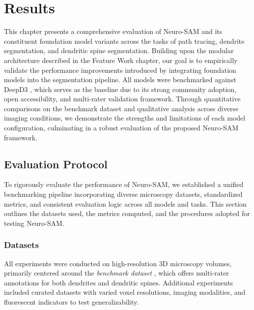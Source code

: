 \chapter{Results}

This chapter presents a comprehensive evaluation of Neuro-\gls{SAM} and its constituent foundation model variants across the tasks of path tracing, dendrite segmentation, and dendritic spine segmentation. Building upon the modular architecture described in the Feature Work chapter, our goal is to empirically validate the performance improvements introduced by integrating foundation models into the segmentation pipeline. All models were benchmarked against \gls{DeepD3} \cite{Fernholz_2024}, which serves as the baseline due to its strong community adoption, open accessibility, and multi-rater validation framework. Through quantitative comparisons on the benchmark dataset and qualitative analysis across diverse imaging conditions, we demonstrate the strengths and limitations of each model configuration, culminating in a robust evaluation of the proposed Neuro-\gls{SAM} framework.

\section{Evaluation Protocol}
To rigorously evaluate the performance of Neuro-\gls{SAM}, we established a unified benchmarking pipeline incorporating diverse microscopy datasets, standardized metrics, and consistent evaluation logic across all models and tasks. This section outlines the datasets used, the metrics computed, and the procedures adopted for testing Neuro-\gls{SAM}.

\subsection{Datasets}
All experiments were conducted on high-resolution 3D microscopy volumes, primarily centered around the \textit{benchmark dataset} \cite{Fernholz_2024}, which offers multi-rater annotations for both dendrites and dendritic spines. Additional experiments included curated datasets with varied voxel resolutions, imaging modalities, and fluorescent indicators to test generalizability.


